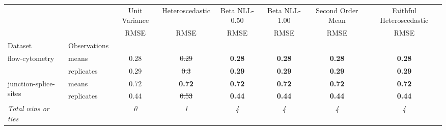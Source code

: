 \begin{tabular}{ll|c|c|c|c|c|c}
\toprule
{} & {} & {Unit Variance} & {Heteroscedastic} & {Beta NLL-0.50} & {Beta NLL-1.00} & {Second Order Mean} & {Faithful Heteroscedastic} \\
{} & {} & {RMSE} & {RMSE} & {RMSE} & {RMSE} & {RMSE} & {RMSE} \\
{Dataset} & {Observations} & {} & {} & {} & {} & {} & {} \\
\midrule
\multirow[c]{2}{*}{flow-cytometry} & means & 0.28 & \sout{0.29} & \textbf{0.28} & \textbf{0.28} & \textbf{0.28} & \textbf{0.28} \\
 & replicates & 0.29 & \sout{0.3} & \textbf{0.29} & \textbf{0.29} & \textbf{0.29} & \textbf{0.29} \\
\multirow[c]{2}{*}{junction-splice-sites} & means & 0.72 & \textbf{0.72} & \textbf{0.72} & \textbf{0.72} & \textbf{0.72} & \textbf{0.72} \\
 & replicates & 0.44 & \sout{0.53} & \textbf{0.44} & \textbf{0.44} & \textbf{0.44} & \textbf{0.44} \\
\textit{{Total wins or ties}} &  & \textit{0} & \textit{1} & \textit{4} & \textit{4} & \textit{4} & \textit{4} \\
\bottomrule
\end{tabular}
